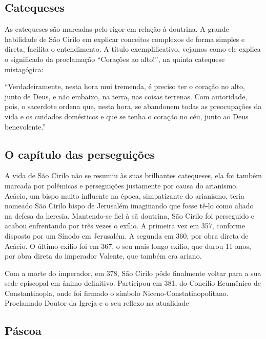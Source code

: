 \documentclass[18pt]{article}
\begin{document}
\begin{justify}
 \begin{justify}
  \subsection{Catequeses}
 \end{justify}


As catequeses são marcadas pelo rigor em relação à doutrina. A grande habilidade de São Cirilo em explicar conceitos complexos de forma simples e direta, facilita o entendimento. A título exemplificativo, vejamos como ele explica o significado da proclamação “Corações ao alto!”, na quinta catequese mistagógica:

“Verdadeiramente, nesta hora mui tremenda, é preciso ter o coração no alto, junto de Deus, e não embaixo, na terra, nas coisas terrenas. Com autoridade, pois, o sacerdote ordena que, nesta hora, se abandonem todas as preocupações da vida e os cuidados domésticos e que se tenha o coração no céu, junto ao Deus benevolente.”

 \begin{justify}
  \subsection{O capítulo das perseguições}
 \end{justify}

A vida de São Cirilo não se resumiu às suas brilhantes catequeses, ela foi também marcada por polêmicas e perseguições justamente por causa do arianismo. Acácio, um bispo muito influente na época, simpatizante do arianismo, teria nomeado São Cirilo bispo de Jerusalém imaginando que fosse tê-lo como aliado na defesa da heresia. Mantendo-se fiel à sã doutrina, São Cirilo foi perseguido e acabou enfrentando por três vezes o exílio. A primeira vez em 357, conforme disposto por um Sínodo em Jerusalém. A segunda em 360, por obra direta de Acácio. O último exílio foi em 367, o seu mais longo exílio, que durou 11 anos, por obra direta do imperador Valente, que também era ariano. 

Com a morte do imperador, em 378, São Cirilo pôde finalmente voltar para a sua sede episcopal em ânimo definitivo. Participou em 381, do Concílio Ecumênico de Constantinopla, onde foi firmado o símbolo Niceno-Constatinopolitano.
Proclamado Doutor da Igreja e o seu reflexo na atualidade

 \begin{justify}
  \subsection{Páscoa}
 \end{justify}


\end{justify}
\end{document}

